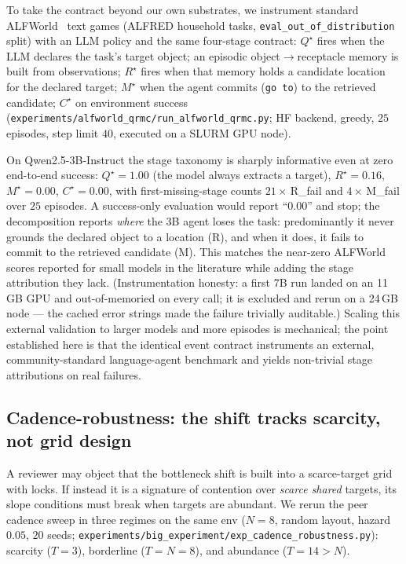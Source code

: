 \documentclass{article}
\newcommand{\method}[1]{\texttt{#1}}
\begin{document}
To take the contract beyond our own substrates, we instrument standard
ALFWorld~\citep{shridhar2021alfworld} text games (ALFRED household tasks,
\texttt{eval\_out\_of\_distribution} split) with an LLM policy and the same
four-stage contract: $Q^\star$ fires when the LLM declares the task's target
object; an episodic object$\to$receptacle memory is built from observations;
$R^\star$ fires when that memory holds a candidate location for the declared
target; $M^\star$ when the agent commits (\texttt{go to}) to the retrieved
candidate; $C^\star$ on environment success
(\method{experiments/alfworld\_qrmc/run\_alfworld\_qrmc.py}; HF backend, greedy,
$25$ episodes, step limit $40$, executed on a SLURM GPU node).

On Qwen2.5-3B-Instruct the stage taxonomy is sharply informative even at zero
end-to-end success: $Q^\star{=}1.00$ (the model always extracts a target),
$R^\star{=}0.16$, $M^\star{=}0.00$, $C^\star{=}0.00$, with first-missing-stage
counts $21\times$\,R\_fail and $4\times$\,M\_fail over $25$ episodes. A success-only
evaluation would report ``$0.00$'' and stop; the decomposition reports
\emph{where} the 3B agent loses the task: predominantly it never grounds the
declared object to a location (R), and when it does, it fails to commit to the
retrieved candidate (M). This matches the near-zero ALFWorld scores reported
for small models in the literature while adding the stage attribution they
lack. (Instrumentation honesty: a first 7B run landed on an 11\,GB GPU and
out-of-memoried on every call; it is excluded and rerun on a 24\,GB node ---
the cached error strings made the failure trivially auditable.) Scaling this
external validation to larger models and more episodes is mechanical; the
point established here is that the identical event contract instruments an
external, community-standard language-agent benchmark and yields non-trivial
stage attributions on real failures.

\subsection{Cadence-robustness: the shift tracks scarcity, not grid design}
\label{p1:app:cadence-robustness}

A reviewer may object that the bottleneck shift is built into a scarce-target
grid with locks. If instead it is a signature of contention over \emph{scarce
shared} targets, its slope conditions must break when targets are abundant. We
rerun the peer cadence sweep in three regimes on the same env ($N{=}8$, random
layout, hazard $0.05$, $20$ seeds; \method{experiments/big\_experiment/exp\_cadence\_robustness.py}):
scarcity ($T{=}3$), borderline ($T{=}N{=}8$), and abundance ($T{=}14{>}N$).
\end{document}
